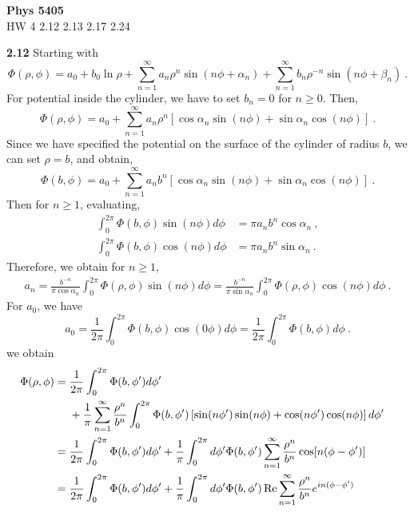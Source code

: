 \documentclass[12pt]{article}
\begin{document}
\begin{center}
{\bf Phys 5405}\\
HW 4 2.12 2.13 2.17 2.24
\end{center}
\textbf{2.12} Starting with
\begin{equation}
    \Phi(\rho, \phi) = a_0 + b_0 \ln \rho + \sum_{n=1}^\infty a_n \rho^n \sin(n \phi + \alpha_n) + \sum_{n=1}^\infty b_n \rho^{-n} \sin(n \phi + \beta_n)~.
\end{equation}
For potential inside the cylinder, we have to set $b_n = 0$ for $n \ge 0$.
Then,
\begin{equation}
    \Phi(\rho, \phi) = a_0 + \sum_{n=1}^\infty a_n \rho^n\left[\cos\alpha_n \sin(n \phi) + \sin \alpha_n  \cos(n \phi)\right]~.
\end{equation}
Since we have specified the potential on the surface of the cylinder of radius $b$, we can set $\rho = b$, and obtain,
\begin{equation}
    \Phi(b, \phi) = a_0 + \sum_{n=1}^\infty a_n b^n \left[\cos\alpha_n \sin(n \phi) + \sin \alpha_n  \cos(n \phi)\right]~.
\end{equation}
Then for $n \ge 1$, evaluating,
\begin{align}
    \int_0^{2\pi} \Phi(b, \phi) \sin(n \phi) d\phi &= \pi a_n b^n \cos\alpha_n ~,\\
    \int_0^{2\pi} \Phi(b, \phi) \cos(n \phi) d\phi & = \pi a_n b^n \sin\alpha_n ~.
\end{align}
Therefore, we obtain for $n \ge 1$,
\begin{align}
    a_n = \frac{b^{-n}}{\pi \cos \alpha_n}  \int_0^{2\pi } \Phi(\rho, \phi) \sin(n \phi) d \phi = \frac{b^{-n}}{\pi \sin \alpha_n}  \int_0^{2\pi } \Phi(\rho, \phi) \cos(n \phi) d \phi~.
\end{align}
For $a_0$, we have
\begin{equation}
    a_0 = \frac{1}{2\pi}\int_0^{2\pi} \Phi(b, \phi) \cos(0 \phi) d\phi = \frac{1}{2\pi} \int_0^{2\pi} \Phi(b,\phi) d\phi~.
\end{equation}
we obtain
\begin{align}
    \Phi(\rho, \phi) &= \frac{1}{2\pi} \int_0^{2\pi} \Phi(b,\phi') d\phi' \cr
    &~~~~+ \frac1\pi \sum_{n=1}^\infty  \frac{\rho^n}{b^n} \int_0^{2\pi} \Phi(b, \phi') \left[\sin(n\phi') \sin(n \phi) + \cos(n \phi') \cos(n \phi)\right]d\phi' \cr
    &= \frac{1}{2\pi} \int_0^{2\pi} \Phi(b,\phi') d\phi' + \frac{1}{\pi} \int_0^{2\pi} d\phi' \Phi(b, \phi')\sum_{n=1}^\infty \frac{\rho^n}{b^n} \cos[n(\phi - \phi')]\cr
    & = \frac{1}{2\pi} \int_0^{2\pi} \Phi(b,\phi') d\phi' + \frac{1}{\pi} \int_0^{2\pi} d\phi' \Phi(b, \phi')\,{\rm Re}\sum_{n=1}^\infty \frac{\rho^n}{b^n} e^{in(\phi - \phi')}
\end{align}
\end{document}
